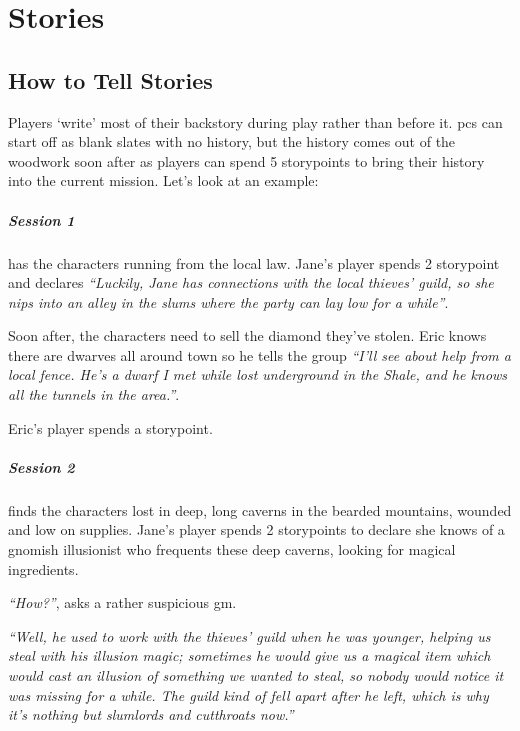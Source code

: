 \chapter[House of Stories]{Stories}
\label{stories}


\section{How to Tell Stories}

\begin{multicols}{2}

\noindent
Players `write' most of their backstory during play rather than before it.
\Glspl{pc} can start off as blank slates with no history, but the history comes out of the woodwork soon after as players can spend 5 \glspl{storypoint} to bring their history into the current mission.
Let's look at an example:

\paragraph{Session 1} has the characters running from the local law.
Jane's player spends 2 \gls{storypoint} and declares \textit{``Luckily, Jane has connections with the local thieves' guild, so she nips into an alley in the slums where the party can lay low for a while''}.

Soon after, the characters need to sell the diamond they've stolen.
Eric knows there are dwarves all around town so he tells the group \textit{``I'll see about help from a local fence.
He's a dwarf I met while lost underground in the Shale, and he knows all the tunnels in the area.''}.

Eric's player spends a \gls{storypoint}.

\paragraph{Session 2} finds the characters lost in deep, long caverns in the bearded mountains, wounded and low on supplies.
Jane's player spends 2 \glspl{storypoint} to declare she knows of a gnomish illusionist who frequents these deep caverns, looking for magical ingredients.

\textit{``How?''}, asks a rather suspicious \gls{gm}.

\textit{``Well, he used to work with the thieves' guild when he was younger, helping us steal with his illusion magic; sometimes he would give us a magical item which would cast an illusion of something we wanted to steal, so nobody would notice it was missing for a while.
The guild kind of fell apart after he left, which is why it's nothing but slumlords and cutthroats now.''}


\end{multicols}
